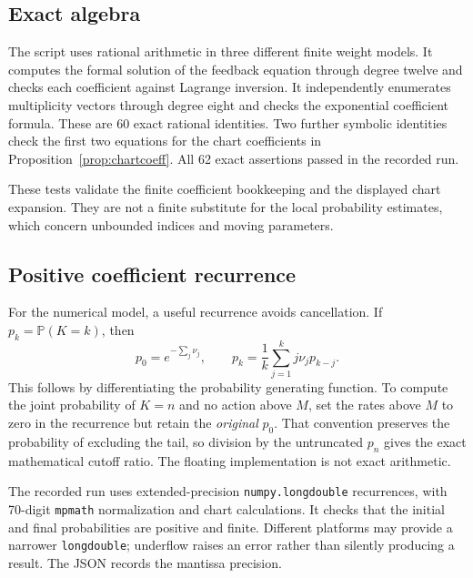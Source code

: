 \documentclass[11pt,a4paper]{article}
\numberwithin{equation}{section}
\theoremstyle{definition}
\theoremstyle{remark}
\newcommand{\Prob}{\mathbb P}
\begin{document}
\subsection{Exact algebra}
The script uses rational arithmetic in three different finite weight
models. It computes the formal solution of the feedback equation through
degree twelve and checks each coefficient against Lagrange inversion.
It independently enumerates multiplicity vectors through degree eight and
checks the exponential coefficient formula. These are 60 exact rational
identities. Two further symbolic identities check the first two equations
for the chart coefficients in Proposition~\ref{prop:chartcoeff}. All 62
exact assertions passed in the recorded run.

These tests validate the finite coefficient bookkeeping and the displayed
chart expansion. They are not a finite substitute for the local
probability estimates, which concern unbounded indices and moving
parameters.

\subsection{Positive coefficient recurrence}
For the numerical model, a useful recurrence avoids cancellation. If
$p_k=\Prob(K=k)$, then
\begin{equation}\label{eq:panjer}
 p_0=e^{-\sum_j\nu_j},\qquad
 p_k=\frac1k\sum_{j=1}^k j\nu_jp_{k-j}.
\end{equation}
This follows by differentiating the probability generating function. To
compute the joint probability of $K=n$ and no action above $M$, set the
rates above $M$ to zero in the recurrence but retain the \emph{original}
$p_0$. That convention preserves the probability of excluding the tail,
so division by the untruncated $p_n$ gives the exact mathematical cutoff
ratio. The floating implementation is not exact arithmetic.

The recorded run uses extended-precision \texttt{numpy.longdouble}
recurrences, with 70-digit \texttt{mpmath} normalization and chart
calculations. It checks that the initial and final probabilities are
positive and finite. Different platforms may provide a narrower
\texttt{longdouble}; underflow raises an error rather than silently
producing a result. The JSON records the mantissa precision.
\end{document}
